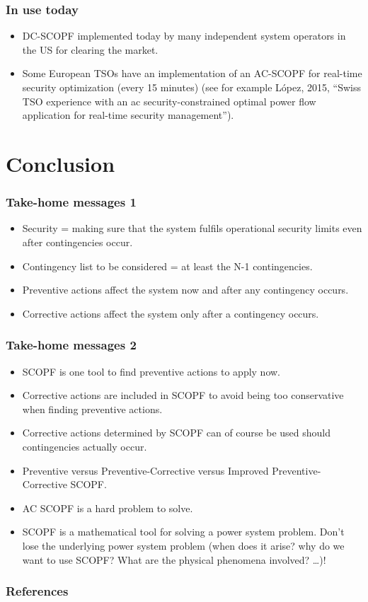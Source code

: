 \documentclass[compress]{beamer}
\begin{document}
\begin{frame}
  \frametitle{In use today}
  \begin{itemize}
  \item DC-SCOPF implemented today by many independent system operators in the US for clearing the market.
  \item Some European TSOs have an implementation of an AC-SCOPF for real-time security optimization (every 15 minutes) (see for example López, 2015, ``Swiss TSO experience with an ac security-constrained optimal power flow application for real-time security management'').
  \end{itemize}
\end{frame}

\section{Conclusion}

\begin{frame}
  \frametitle{Take-home messages 1}
  \begin{itemize}
  \item Security = making sure that the system fulfils operational security limits even after contingencies occur.
  \item Contingency list to be considered = at least the N-1 contingencies.
  \item Preventive actions affect the system now and after any contingency occurs.
  \item Corrective actions affect the system only after a contingency occurs.
  \end{itemize}
\end{frame}

\begin{frame}
  \frametitle{Take-home messages 2}
  \begin{itemize}
  \item SCOPF is one tool to find preventive actions to apply now.
  \item Corrective actions are included in SCOPF to avoid being too conservative when finding preventive actions.
  \item Corrective actions determined by SCOPF can of course be used should contingencies actually occur.
  \item Preventive versus Preventive-Corrective versus Improved Preventive-Corrective SCOPF.
  \item AC SCOPF is a hard problem to solve.
  \item SCOPF is a mathematical tool for solving a power system problem. Don't lose the underlying power system problem (when does it arise? why do we want to use SCOPF? What are the physical phenomena involved? \ldots)!
  \end{itemize}
\end{frame}

\begin{frame}[allowframebreaks]
\frametitle{References}
\printbibliography
\end{frame}
\end{document}
